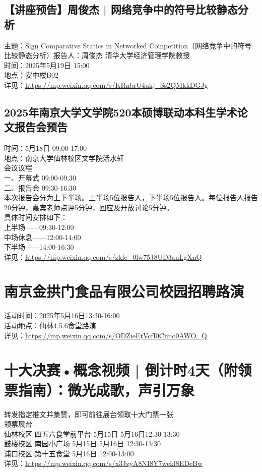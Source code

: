 \documentclass[letterpaper, 12pt]{article}
\begin{document}
\begin{multicols}{2}
\subsection{【讲座预告】周俊杰 | 网络竞争中的符号比较静态分析} %
主题：Sign Comparative Statics in Networked Competition（网络竞争中的符号比较静态分析）报告人：周俊杰 清华大学经济管理学院教授 
\\时间：2025年5月19日 15:00
\\地点：安中楼B02 
\\详见：\url{https://mp.weixin.qq.com/s/KRnbrU4ukj_Ss2QMkkDGJg}

\subsection{2025年南京大学文学院520本硕博联动本科生学术论文报告会预告} %
时间：5月18日 09:00-17:00
\\地点：南京大学仙林校区文学院活水轩
\\会议议程
\\一、开幕式 09:00-09:30
\\二、报告会 09:30-16:30
\\本次报告会分为上下半场。上半场5位报告人，下半场5位报告人。每位报告人报告20分钟，嘉宾老师点评5分钟，回应及开放讨论5分钟。
\\具体时间安排如下：
\\上半场——09:30-12:00
\\中场休息——12:00-14:00
\\下半场——14:00-16:30
\\详见：\url{https://mp.weixin.qq.com/s/zkfe_0lw75J8UD3anLgXnQ}


\section{南京金拱门食品有限公司校园招聘路演} %
活动时间：2025年5月16日13:30-16:00
\\活动地点：仙林4.5.6食堂路演
\\详见：\url{https://mp.weixin.qq.com/s/ODZieEtVcfI0Cimo0AWO_Q}
\section{十大决赛•概念视频 | 倒计时4天（附领票指南）：微光成歌，声引万象} %
转发指定推文并集赞，即可前往展台领取十大门票一张
\\领票展台
\\仙林校区 四五六食堂前平台 5月15日 5月16日12:30-13:30
\\鼓楼校区 南园小广场 5月15日 5月16日 12:30-13:30
\\浦口校区 第十五食堂 5月16日 12:00-13:00
\\详见：\url{https://mp.weixin.qq.com/s/x3JzyA8NI8Y7wekl8EDeBw}

\end{multicols}
\end{document}
